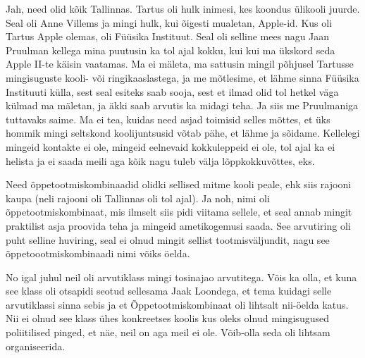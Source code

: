 Jah, need olid kõik Tallinnas. Tartus oli hulk inimesi, kes koondus ülikooli juurde. Seal oli Anne Villems ja mingi hulk, kui õigesti mualetan,  Apple-id. Kus oli Tartus Apple olemas, oli Füüsika Instituut. Seal oli selline mees nagu Jaan Pruulman kellega mina puutusin ka tol ajal  kokku, kui kui ma ükskord seda Apple II-te käisin vaatamas. Ma ei mäleta, ma sattusin mingil põhjusel Tartusse mingisuguste kooli- või ringikaaslastega, ja  me mõtlesime, et lähme sinna Füüsika Instituuti külla, sest seal esiteks saab sooja, sest et ilmad olid tol hetkel väga külmad ma mäletan, ja äkki saab arvutis ka midagi teha. Ja siis me Pruulmaniga tuttavaks saime. Ma ei tea, kuidas need asjad toimisid selles mõttes, et üks hommik mingi seltskond koolijuntsusid võtab pähe, et lähme ja sõidame. Kellelegi mingeid kontakte ei ole, mingeid eelnevaid kokkuleppeid ei ole, tol ajal ka ei helista ja ei saada meili  aga kõik nagu tuleb välja lõppkokkuvõttes, eks.

\label{content!OTK}

Need õppetootmiskombinaadid olidki sellised mitme kooli peale, ehk siis rajooni kaupa (neli rajooni oli Tallinnas oli tol ajal). Ja noh, nimi oli õppetootmiskombinaat, mis ilmselt siis pidi viitama sellele, et seal annab mingit praktilist asja proovida teha ja mingeid ametikogemusi saada. See arvutiring oli puht selline huviring, seal ei olnud mingit sellist tootmisväljundit, nagu see õppetoootmiskombinaadi nimi võiks öelda.


No igal juhul neil oli arvutiklass mingi tosinajao arvutitega. Võis ka olla, et kuna see klass oli otsapidi seotud sellesama Jaak Loondega, et tema kuidagi selle arvutiklassi sinna sebis ja et Õppetootmiskombinaat oli lihtsalt nii-öelda katus. Nii  ei olnud see klass ühes konkreetses koolis kus oleks olnud mingisugused poliitilised pinged, et näe, neil on aga meil ei ole. Võib-olla seda oli lihtsam organiseerida. 


